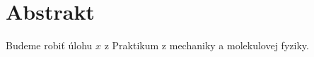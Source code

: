 \section{Abstrakt}

Budeme robiť úlohu $x$ z Praktikum z mechaniky a molekulovej fyziky\cite{zrubáková2003praktikum}. \lipsum[1]